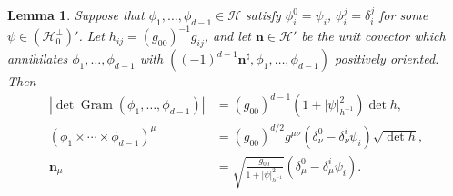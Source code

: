 \documentclass[reqno,12pt,letterpaper]{amsart}
\DeclareMathOperator{\Gram}{Gram}
\newcommand{\Hilb}{\mathcal H}
\newcommand{\normal}{\mathbf n}
\newtheorem{lemma}[theorem]{Lemma}
\theoremstyle{definition}
\numberwithin{equation}{section}
\begin{document}
\begin{lemma} \label{cross product formula}
Suppose that $\phi_1, \dots, \phi_{d - 1} \in \Hilb$ satisfy $\phi_i^0 = \psi_i$, $\phi_i^j = \delta_i^j$ for some $\psi \in (\Hilb_0^\perp)'$.
Let $h_{ij} = (g_{00})^{-1} g_{ij}$, and let $\normal \in \Hilb'$ be the unit covector which annihilates $\phi_1, \dots, \phi_{d - 1}$ with $((-1)^{d - 1}\normal^\sharp, \phi_1, \dots, \phi_{d - 1})$ positively oriented.
Then
\begin{align}
|\det \Gram(\phi_1, \dots, \phi_{d - 1})| &= (g_{00})^{d - 1} (1 + |\psi|_{h^{-1}}^2) \det h, \label{WeinsteinAronszajn} \\
(\phi_1 \times \cdots \times \phi_{d - 1})^\mu &= (g_{00})^{d/2} g^{\mu \nu}(\delta_\nu^0 - \delta^i_\nu \psi_i) \sqrt{\det h}, \label{CrossProduct} \\
\normal_\mu &= \sqrt{\frac{g_{00}}{1 + |\psi|_{h^{-1}}^2}} (\delta^0_\mu - \delta^i_\mu \psi_i) \label{conormal crossproduct}.
\end{align}
\end{lemma}
\end{document}
